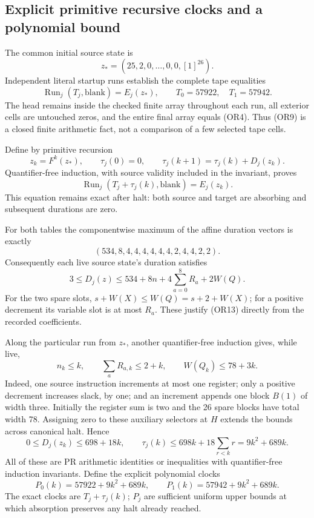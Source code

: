 \subsection{Explicit primitive recursive clocks and a polynomial bound}

The common initial source state is
\[
 z_*=(25,2,0,\ldots,0,0,[1]^{26}).
\]
Independent literal startup runs establish the complete tape
equalities
\[
 \operatorname{Run}_j(T_j,\mathrm{blank})=E_j(z_*),
 \qquad T_0=57922,\quad T_1=57942.
 \tag{OR9}
\]
The head remains inside the checked finite array throughout each
run, all exterior cells are untouched zeros, and the entire final
array equals (OR4).  Thus (OR9) is a closed finite arithmetic fact,
not a comparison of a few selected tape cells.

Define by primitive recursion
\[
 z_k=F^k(z_*),\qquad
 \tau_j(0)=0,\qquad
 \tau_j(k+1)=\tau_j(k)+D_j(z_k).
 \tag{OR10}
\]
Quantifier-free induction, with source validity included in the
invariant, proves
\[
 \operatorname{Run}_j(T_j+\tau_j(k),\mathrm{blank})=E_j(z_k).
 \tag{OR11}
\]
This equation remains exact after halt: both source and target are
absorbing and subsequent durations are zero.

For both tables the componentwise maximum of the affine duration
vectors is exactly
\[
 (534,8,4,4,4,4,4,4,2,4,4,2,2).
 \tag{OR12}
\]
Consequently each live source state's duration satisfies
\[
 3\le D_j(z)\le534+8n+4\sum_{a=0}^8R_a+2W(Q).
 \tag{OR13}
\]
For the two spare slots, $s+W(X)\le W(Q)=s+2+W(X)$;
for a positive decrement its variable slot is at most $R_a$.
These justify (OR13) directly from the recorded coefficients.

Along the particular run from $z_*$, another quantifier-free
induction gives, while live,
\[
 n_k\le k,\qquad \sum_aR_{a,k}\le2+k,
 \qquad W(Q_k)\le78+3k.
 \tag{OR14}
\]
Indeed, one source instruction increments at most one register;
only a positive decrement increases slack, by one; and an increment
appends one block $B(1)$ of width three.  Initially the register
sum is two and the 26 spare blocks have total width 78.
Assigning zero to these auxiliary selectors at $H$ extends the
bounds across canonical halt.  Hence
\[
 0\le D_j(z_k)\le698+18k,\qquad
 \tau_j(k)\le698k+18\sum_{r<k}r=9k^2+689k.
 \tag{OR15}
\]
All of these are PR arithmetic identities or inequalities with
quantifier-free induction invariants.  Define the explicit
polynomial clocks
\[
 P_0(k)=57922+9k^2+689k,\qquad
 P_1(k)=57942+9k^2+689k.
 \tag{OR16}
\]
The exact clocks are $T_j+\tau_j(k)$; $P_j$ are sufficient
uniform upper bounds at which absorption preserves any halt
already reached.

